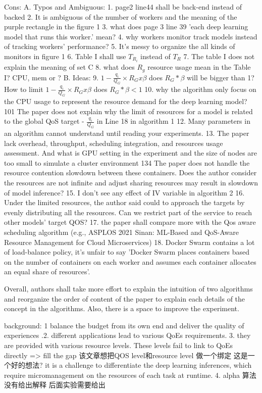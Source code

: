 \documentclass[UTF8]{article}
\begin{document}
    Cons: A. Typos and Ambiguous: 1. page2 line44 shall be back-end instead of backed 2. It is ambiguous of the number of workers and the meaning of the purple rectangle in the figure 1 3. what does page 3 line 39 'each deep learning model that runs this worker.' mean? 4. why workers monitor track models instead of tracking workers' performance? 5. It's messy to organize the all kinds of monitors in figure 1 6. Table I shall use $T_{R_i}$ instead of $T_R$ 7. The table I does not explain the meaning of set C 8. what does $R_g$ resource usage mean in the Table I? CPU, mem or ? B. Ideas: 9.  $1− \frac{q_i}{Q_G}×R_Gx\beta$ does $R_G*\beta$ will be bigger than 1? How to limit $1− \frac{q_i}{Q_G}×R_Gx\beta$ does $R_G*\beta < 1$  10. why the algorithm only focus on the CPU usage to represent the resource demand for the deep learning model? 101 The paper does not explain why the limit of resources for a model is related to the global QoS target - $\frac{q_i}{Q_G}$ in Line 18 in algorithm 1 12. Many parameters in an algorithm cannot understand until reading your experiments. 13. The paper lack overhead, throughput, scheduling integration, and resources usage assessment. And what is GPU setting in the experiment and the size of nodes are too small to simulate a cluster environment 134 The paper does not handle the resource contention slowdown between these containers. Does the author consider the resources are not infinite and adjust sharing resources may result in slowdown of model inference? 15. I don't see any effect of IV variable in algorithm 2 16. Under the limited resources, the author said could to approach the targets by evenly distributing all the resources. Can we restrict part of the service to reach other models' target QOS?  17. the paper shall compare more with the Qos aware scheduling algorithm (e.g., ASPLOS 2021 Sinan: ML-Based and QoS-Aware Resource Management for Cloud Microservices) 18. Docker Swarm contains a lot of load-balance policy,  it's unfair to say 'Docker Swarm places containers based on the number of containers on each worker and assumes each container allocates an equal share of resources'.  
    
    Overall, authors shall take more effort to explain the intuition of two algorithms and reorganize the order of content of the paper to explain each details of the concept in the algorithms. Also, there is a space to improve the experiment.
    
    background: 1 balance the budget from its own end and deliver the quality of experiences .2. different applications lead to various QoEs requirements. 3. they are provided with various resource levels. These levels fail to link to QoEs directly => fill the gap 该文章想把QOS level和resource level 做一个绑定 这是一个好的想法? it is a challenge to differentiate the deep learning inferences, which require micromanagement on the resources of each task at runtime. 4. alpha 算法没有给出解释 后面实验需要给出
    
\end{document}
